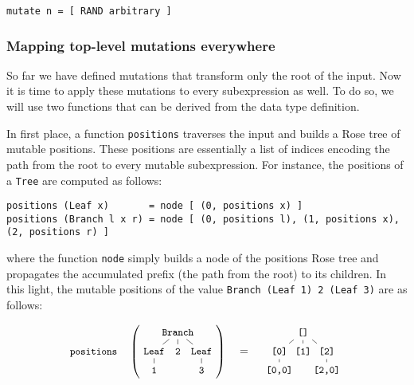 \documentclass[acmsmall, anonymous]{acmart}
\begin{document}
\begin{verbatim}
mutate n = [ RAND arbitrary ]
\end{verbatim}


\subsubsection{Mapping top-level mutations everywhere}

So far we have defined mutations that transform only the root of the input.
%
Now it is time to apply these mutations to every subexpression as well.
%
To do so, we will use two functions that can be derived from the data type
definition.


In first place, a function \texttt{positions} traverses the input and builds a
Rose tree of mutable positions.
%
These positions are essentially a list of indices encoding the path from the
root to every mutable subexpression.
%
For instance, the positions of a \texttt{Tree} are computed as follows:

\begin{verbatim}
positions (Leaf x)       = node [ (0, positions x) ]
positions (Branch l x r) = node [ (0, positions l), (1, positions x), (2, positions r) ]
\end{verbatim}

\noindent where the function \texttt{node} simply builds a node of the positions
Rose tree and propagates the accumulated prefix (the path from the root) to its
children.
%
In this light, the mutable positions of the value \texttt{Branch (Leaf 1) 2
  (Leaf 3)} are as follows:

\begin{equation}
  \nonumber
  {\small \texttt{positions}}\quad
  \left(
  \tikz[
    baseline=-7mm,
    level distance=0.6cm,
    level 1/.style={sibling distance=0.75cm},
    level 2/.style={sibling distance=0.75cm}
  ]{
    \node {\small \texttt{Branch}}
      child {node {\small \texttt{Leaf}}
        child {node {\small \texttt{1}}}
      }
      child {node {\small \texttt{2}}}
      child {node {\small \texttt{Leaf}}
        child {node {\small \texttt{3}}}
      };
  }
  \right)
  \quad
  =
  \quad
  \tikz[
    baseline=-7mm,
    level distance=0.6cm,
    level 1/.style={sibling distance=0.75cm},
    level 2/.style={sibling distance=0.75cm}
  ]{
    \node {\texttt{\small []}}
      child {node {\small \texttt{[0]}}
        child {node {\small \texttt{[0,0]}}}
      }
      child {node {\small \texttt{[1]}}}
      child {node {\small \texttt{[2]}}
        child {node {\small \texttt{[2,0]}}}
      };
  }
\end{equation}
\end{document}
